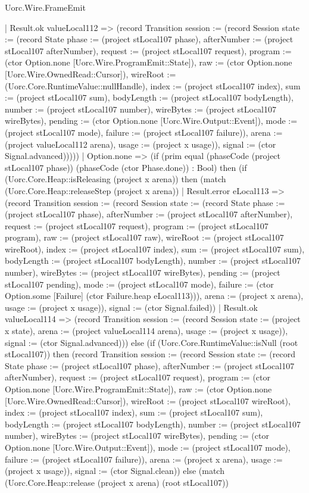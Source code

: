 \begin{lexlean}{Uorc.Wire.FrameEmit}
\begin{semanticmodule}
{      | Result.ok valueLocal112 => (record Transition {session := (record Session {state := (record State {phase := (project stLocal107 phase), afterNumber := (project stLocal107 afterNumber), request := (project stLocal107 request), program := (ctor Option.none [Uorc.Wire.ProgramEmit::State]), raw := (ctor Option.none [Uorc.Wire.OwnedRead::Cursor]), wireRoot := (Uorc.Core.RuntimeValue::nullHandle), index := (project stLocal107 index), sum := (project stLocal107 sum), bodyLength := (project stLocal107 bodyLength), number := (project stLocal107 number), wireBytes := (project stLocal107 wireBytes), pending := (ctor Option.none [Uorc.Wire.Output::Event]), mode := (project stLocal107 mode), failure := (project stLocal107 failure)}), arena := (project valueLocal112 arena), usage := (project x usage)}), signal := (ctor Signal.advanced)}))))
    | Option.none => (if (prim equal (phaseCode (project stLocal107 phase)) (phaseCode (ctor Phase.done)) : Bool) then (if (Uorc.Core.Heap::isReleasing (project x arena)) then (match (Uorc.Core.Heap::releaseStep (project x arena))
      | Result.error eLocal113 => (record Transition {session := (record Session {state := (record State {phase := (project stLocal107 phase), afterNumber := (project stLocal107 afterNumber), request := (project stLocal107 request), program := (project stLocal107 program), raw := (project stLocal107 raw), wireRoot := (project stLocal107 wireRoot), index := (project stLocal107 index), sum := (project stLocal107 sum), bodyLength := (project stLocal107 bodyLength), number := (project stLocal107 number), wireBytes := (project stLocal107 wireBytes), pending := (project stLocal107 pending), mode := (project stLocal107 mode), failure := (ctor Option.some [Failure] (ctor Failure.heap eLocal113))}), arena := (project x arena), usage := (project x usage)}), signal := (ctor Signal.failed)})
      | Result.ok valueLocal114 => (record Transition {session := (record Session {state := (project x state), arena := (project valueLocal114 arena), usage := (project x usage)}), signal := (ctor Signal.advanced)})) else (if (Uorc.Core.RuntimeValue::isNull (root stLocal107)) then (record Transition {session := (record Session {state := (record State {phase := (project stLocal107 phase), afterNumber := (project stLocal107 afterNumber), request := (project stLocal107 request), program := (ctor Option.none [Uorc.Wire.ProgramEmit::State]), raw := (ctor Option.none [Uorc.Wire.OwnedRead::Cursor]), wireRoot := (project stLocal107 wireRoot), index := (project stLocal107 index), sum := (project stLocal107 sum), bodyLength := (project stLocal107 bodyLength), number := (project stLocal107 number), wireBytes := (project stLocal107 wireBytes), pending := (ctor Option.none [Uorc.Wire.Output::Event]), mode := (project stLocal107 mode), failure := (project stLocal107 failure)}), arena := (project x arena), usage := (project x usage)}), signal := (ctor Signal.clean)}) else (match (Uorc.Core.Heap::release (project x arena) (root stLocal107))
}
\end{semanticmodule}
\end{lexlean}
